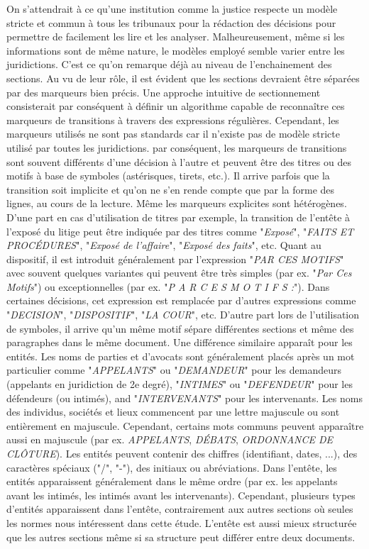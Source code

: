 On s'attendrait à ce qu'une institution comme la justice respecte un modèle stricte et commun à tous les tribunaux pour la rédaction des décisions pour permettre de facilement les lire et les analyser. Malheureusement, même si les informations sont de même nature, le modèles employé semble varier entre les juridictions. C'est ce qu'on remarque déjà au niveau de l'enchainement des sections. Au vu de leur rôle, il est évident que les sections devraient être séparées par des marqueurs bien précis. Une approche intuitive de sectionnement consisterait par conséquent à définir un algorithme capable de reconnaître ces marqueurs de transitions à travers des expressions régulières. Cependant, les marqueurs utilisés ne sont pas standards car il n'existe pas de modèle stricte utilisé par toutes les juridictions. par conséquent, les marqueurs de transitions sont souvent différents d'une décision à l'autre et peuvent être des titres ou des motifs à base de symboles (astérisques, tirets, etc.). Il arrive parfois que la transition soit implicite et qu'on ne s'en rende compte que par la forme des lignes, au cours de la lecture. Même les marqueurs explicites sont hétérogènes. D'une part en cas d'utilisation de titres par exemple, la transition de l'entête à l'exposé du litige peut être indiquée par des titres comme "\textit{Exposé}", "\textit{FAITS ET PROCÉDURES}", "\textit{Exposé de l'affaire}", "\textit{Exposé des faits}", etc. Quant au dispositif, il est introduit généralement par l'expression "\textit{PAR CES MOTIFS}" avec souvent quelques variantes qui peuvent être très simples (par ex. "\textit{Par Ces Motifs}") ou exceptionnelles (par ex. "\textit{P A R C E S M O T I F S :}"). Dans certaines décisions, cet expression est remplacée par d'autres expressions comme "\textit{DECISION}", "\textit{DISPOSITIF}", "\textit{LA COUR}", etc. 
D'autre part lors de l'utilisation de symboles, il arrive qu'un même motif sépare différentes sections et même des paragraphes dans le même document. Une différence similaire apparaît pour les entités. Les noms de parties et d'avocats sont généralement placés après un mot particulier comme  "\textit{APPELANTS}" ou "\textit{DEMANDEUR}" pour les demandeurs (appelants en juridiction de 2e degré), "\textit{INTIMES}" ou "\textit{DEFENDEUR}" pour les défendeurs (ou intimés), and "\textit{INTERVENANTS}" pour les intervenants. Les noms des individus, sociétés et lieux commencent par une lettre majuscule ou sont entièrement en majuscule. Cependant, certains mots communs peuvent apparaître aussi en majuscule (par ex. \textit{APPELANTS}, \textit{DÉBATS}, \textit{ORDONNANCE DE CLÔTURE}). Les entités peuvent contenir des chiffres (identifiant, dates, ...), des caractères spéciaux ("/", "-"), des initiaux ou abréviations.  Dans l'entête, les entités apparaissent généralement dans le même ordre (par ex. les appelants avant les intimés, les intimés avant les intervenants). Cependant, plusieurs types d'entités apparaissent dans l'entête, contrairement aux autres sections où seules les normes nous intéressent dans cette étude. L'entête est aussi mieux structurée que les autres sections même si sa structure peut différer entre deux documents.

